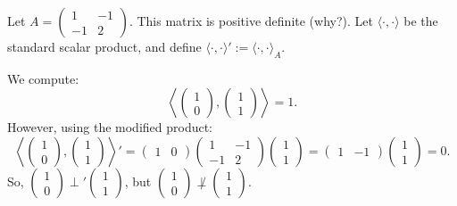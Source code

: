 \begin{example}
    Let $A = \begin{pmatrix} 1 & -1 \\ -1 & 2 \end{pmatrix}$. This matrix is positive definite (why?). 
    Let $\langle \cdot, \cdot \rangle$ be the standard scalar product, and define $\langle \cdot, \cdot \rangle' := \langle \cdot, \cdot \rangle_A$.
    
    We compute:
    \begin{equation*}
        \left\langle \begin{pmatrix} 1 \\ 0 \end{pmatrix}, \begin{pmatrix} 1 \\ 1 \end{pmatrix} \right\rangle = 1.
    \end{equation*}
    However, using the modified product:
    \begin{equation*}
        \left\langle \begin{pmatrix} 1 \\ 0 \end{pmatrix}, \begin{pmatrix} 1 \\ 1 \end{pmatrix} \right\rangle' = \begin{pmatrix} 1 & 0 \end{pmatrix} \begin{pmatrix} 1 & -1 \\ -1 & 2 \end{pmatrix} \begin{pmatrix} 1 \\ 1 \end{pmatrix} = \begin{pmatrix} 1 & -1 \end{pmatrix} \begin{pmatrix} 1 \\ 1 \end{pmatrix} = 0.
    \end{equation*}
    So, $\left(\begin{smallmatrix} 1 \\ 0 \end{smallmatrix}\right) \perp' \left(\begin{smallmatrix} 1 \\ 1 \end{smallmatrix}\right)$, but $\left(\begin{smallmatrix} 1 \\ 0 \end{smallmatrix}\right) \not\perp \left(\begin{smallmatrix} 1 \\ 1 \end{smallmatrix}\right)$.


\end{example}
